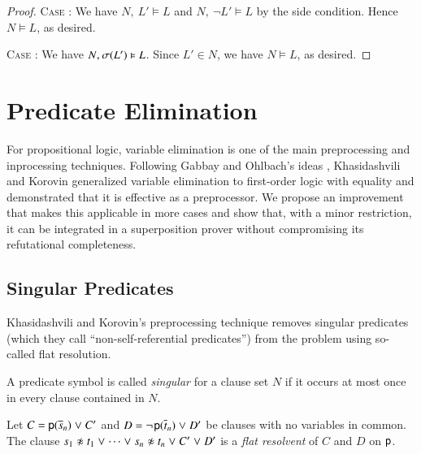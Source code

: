 \begin{rep}
\begin{proof}
\medskip

\noindent
\textsc{Case} :\enskip
We have $N{,}\> L' \models L$ and $N{,}\> \lnot L' \models L$ by the side condition.
Hence $N \models L$, as desired.

\medskip

\noindent
\textsc{Case} :\enskip
We have $N{,}\> \sigma(L') \vDash L$. Since $L' \in N$, we have $N \models L$,
as desired.
\qedhere
\end{proof}
\end{rep}

\section{Predicate Elimination}
\label{sec:satfol:predicate-elimination}

For propositional logic, variable elimination \cite{eb-2005-satpreprocess} is
one of the main preprocessing and inprocessing techniques. Following Gabbay and Ohlbach's ideas
\cite{go-1992-so-pred-elim}, Khasidashvili and Korovin \cite{kk-2016-pe-fol}
generalized variable elimination to first-order logic with equality and
demonstrated that it is effective as a preprocessor. We propose an improvement
that makes this applicable in more cases and show that, with a minor
restriction, it can be integrated in a superposition prover
without compromising its refutational completeness.

\subsection{Singular Predicates}

Khasidashvili and Korovin's preprocessing technique removes singular predicates
(which they call ``non-self-referential predicates'') from the problem using
so-called flat resolution.

\begin{defi}
   A predicate symbol is called \emph{singular}
   for a clause set $N$ if it occurs at most once in every clause contained in
   $N.$
\end{defi}

\begin{defi}
   \label{def:flat-res}
   Let $C = {\mathsf{p}(\overline{s}_{n})} \mathrel{\lor} C'$ and $D =
   \neg{\kern.2ex \mathsf{p}(\overline{t}_{n})} \mathrel{\lor} D'$ be clauses with no variables in
   common. The clause $\neqlit{s_1}{t_1} \cor \cdots \cor \neqlit{s_n}{t_n}
   \cor C' \cor D'$ is a \emph{flat resolvent} of $C$ and $D$ on $\mathsf{p}$.
\end{defi}

